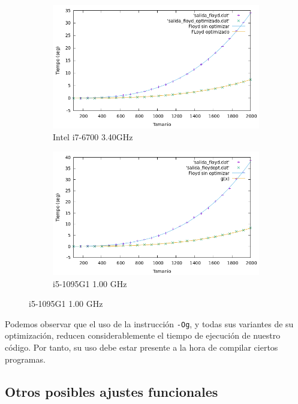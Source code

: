 \documentclass[10pt,a4paper]{article}
\begin{document}
\begin{figure}[h!]
\begin{subfigure}{.5\textwidth}
	\centering
	\includegraphics[scale=0.3]{../../Images/floyd_opt_Javi5454.png}
	\caption{Intel i7-6700 3.40GHz}
	\label{Floyd Optimizado Javi5454}
\end{subfigure}
\hfill
\begin{subfigure}{.5\textwidth}
	\centering
	\includegraphics[scale=0.3]{../../Images/floyd_opt_Jota.png}
	\caption{i5-1095G1 1.00 GHz}
	\label{Floyd Optimizado Jota}
\end{subfigure}
\end{figure}

Podemos observar que el uso de la instrucción \texttt{-Og}, y todas sus variantes de su optimización, reducen considerablemente el tiempo de ejecución de nuestro código. Por tanto, su uso debe estar presente a la hora de compilar ciertos programas.

\subsection{Otros posibles ajustes funcionales}
\end{document}
